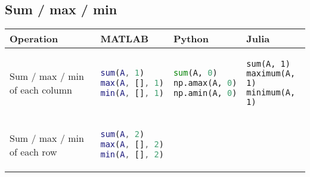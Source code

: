 \documentclass[10pt, landscape]{article}
\begin{document}
\begin{multicols}{2}
\section{Sum / max / min}\label{sum-max-min}

\begin{tabular}[]{@{}llll@{}}
\toprule
\begin{minipage}[b]{0.23\columnwidth}\raggedright\strut
Operation\strut
\end{minipage} & \begin{minipage}[b]{0.22\columnwidth}\raggedright\strut
MATLAB\strut
\end{minipage} & \begin{minipage}[b]{0.24\columnwidth}\raggedright\strut
Python\strut
\end{minipage} & \begin{minipage}[b]{0.20\columnwidth}\raggedright\strut
Julia\strut
\end{minipage}\tabularnewline
\midrule
\begin{minipage}[t]{0.23\columnwidth}\raggedright\strut
Sum / max / min of each column\strut
\end{minipage} & \begin{minipage}[t]{0.22\columnwidth}\raggedright\strut
\begin{lstlisting}[language=Matlab]
sum(A, 1)
max(A, [], 1)
min(A, [], 1)
\end{lstlisting}
\strut
\end{minipage} & \begin{minipage}[t]{0.24\columnwidth}\raggedright\strut
\begin{lstlisting}[language=Python]
sum(A, 0)
np.amax(A, 0)
np.amin(A, 0)
\end{lstlisting}
\strut
\end{minipage} & \begin{minipage}[t]{0.20\columnwidth}\raggedright\strut
\begin{lstlisting}
sum(A, 1)
maximum(A, 1)
minimum(A, 1)
\end{lstlisting}
\strut
\end{minipage}\tabularnewline
\begin{minipage}[t]{0.23\columnwidth}\raggedright\strut
Sum / max / min of each row\strut
\end{minipage} & \begin{minipage}[t]{0.22\columnwidth}\raggedright\strut
\begin{lstlisting}[language=Matlab]
sum(A, 2)
max(A, [], 2)
min(A, [], 2)
\end{lstlisting}

\end{minipage}
\end{tabular}
\end{multicols}
\end{document}
